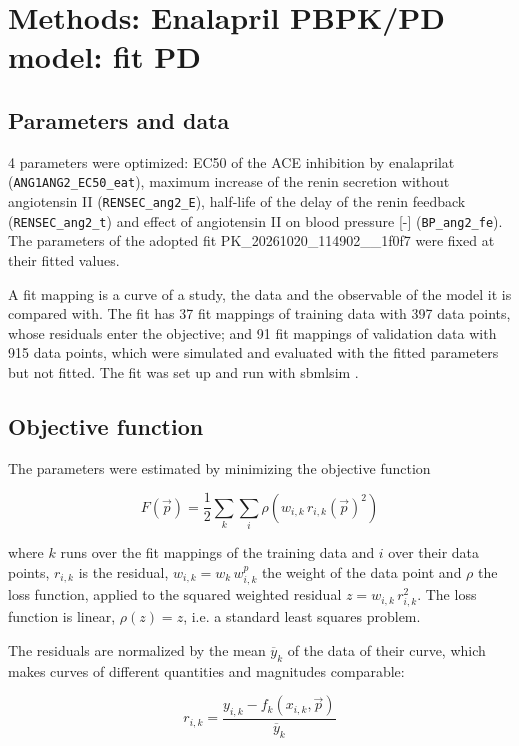 \section{Methods: Enalapril PBPK/PD model: fit PD}

\subsection{Parameters and data}

4 parameters were optimized: EC50 of the ACE inhibition by enalaprilat (\texttt{ANG1ANG2\_EC50\_eat}), maximum increase of the renin secretion without angiotensin II (\texttt{RENSEC\_ang2\_E}), half-life of the delay of the renin feedback (\texttt{RENSEC\_ang2\_t}) and effect of angiotensin II on blood pressure [-] (\texttt{BP\_ang2\_fe}). The parameters of the adopted fit PK\_20261020\_114902\_\_1f0f7 were fixed at their fitted values.

A fit mapping is a curve of a study, the data and the observable of the model it is compared with. The fit has 37 fit mappings of training data with 397 data points, whose residuals enter the objective; and 91 fit mappings of validation data with 915 data points, which were simulated and evaluated with the fitted parameters but not fitted. The fit was set up and run with sbmlsim \cite{Koenig2026_sbmlsim}.

\subsection{Objective function}

The parameters were estimated by minimizing the objective function

\begin{equation}
F(\vec{p}) = \frac{1}{2} \sum_{k} \sum_{i} \rho\left(w_{i,k}\, r_{i,k}(\vec{p})^2\right)
\end{equation}

where $k$ runs over the fit mappings of the training data and $i$ over their data points, $r_{i,k}$ is the residual, $w_{i,k} = w_k\, w^{p}_{i,k}$ the weight of the data point and $\rho$ the loss function, applied to the squared weighted residual $z = w_{i,k}\, r_{i,k}^2$. The loss function is linear, $\rho(z) = z$, i.e. a standard least squares problem.

The residuals are normalized by the mean $\overline{y}_k$ of the data of their curve, which makes curves of different quantities and magnitudes comparable:

\begin{equation}
r_{i,k} = \frac{y_{i,k} - f_k(x_{i,k}, \vec{p})}{\overline{y}_k}
\end{equation}

